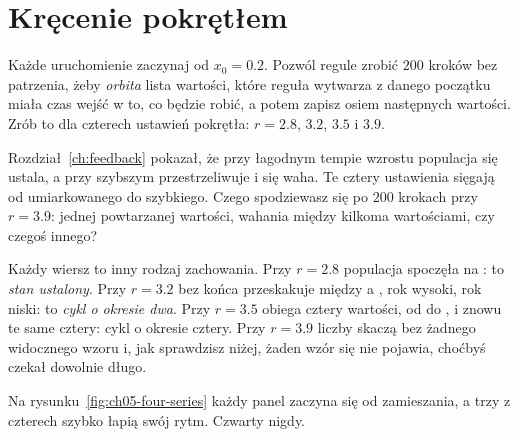 \section{Kręcenie pokrętłem}
\label{sec:ch05-knob}

\noindent
Każde uruchomienie zaczynaj od $x_0 = \num{0.2}$. Pozwól regule zrobić
$200$ kroków bez patrzenia, żeby \emph{orbita} \dash{} lista wartości, które
reguła wytwarza z danego początku \dash{} miała czas wejść w to, co będzie
robić, a potem zapisz osiem następnych wartości. Zrób to dla czterech
ustawień pokrętła: $r = \num{2.8}$, $\num{3.2}$, $\num{3.5}$ i $\num{3.9}$.

\begin{think}
Rozdział~\ref{ch:feedback} pokazał, że przy łagodnym tempie wzrostu
populacja się ustala, a przy szybszym przestrzeliwuje i się waha. Te cztery
ustawienia sięgają od umiarkowanego do szybkiego. Czego spodziewasz się po
$200$ krokach przy $r = \num{3.9}$: jednej powtarzanej wartości, wahania
między kilkoma wartościami, czy czegoś innego?
\end{think}



\noindent
Każdy wiersz to inny rodzaj zachowania. Przy $r = \num{2.8}$ populacja
spoczęła na : to \emph{stan ustalony}. Przy $r = \num{3.2}$
bez końca przeskakuje między  a , rok
wysoki, rok niski: to \emph{cykl o okresie dwa}. Przy $r = \num{3.5}$
obiega cztery wartości, od  do , i znowu
te same cztery: cykl o okresie cztery. Przy $r = \num{3.9}$ liczby skaczą
bez żadnego widocznego wzoru i, jak sprawdzisz niżej, żaden wzór się nie
pojawia, choćbyś czekał dowolnie długo.


\noindent
Na rysunku~\ref{fig:ch05-four-series} każdy panel zaczyna się od
zamieszania, a trzy z czterech szybko łapią swój rytm. Czwarty nigdy.

